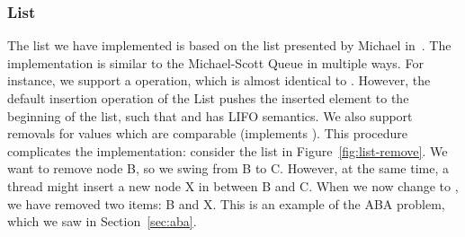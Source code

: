 \documentclass[b5paper]{report}
\begin{document}
\subsubsection{List\label{sec:impl-list}}

The list we have implemented is based on the list presented by Michael
in~\cite{michael2002high}. The implementation is similar to the Michael-Scott
Queue in multiple ways. For instance, we support a 
operation, which is almost identical to . However, the default
insertion operation of the List pushes the inserted element to the beginning of
the list, such that  and  has LIFO
semantics. We also support removals for values which are comparable (implements
).  This
procedure complicates the implementation: consider the list in
Figure~\ref{fig:list-remove}. We want to remove node B, so we swing
 from B to C. However, at the same time, a thread might insert a
new node X in between B and C. When we now change  to , we
have removed two items: B and X. This is an example of the ABA problem, which we
saw in Section~\ref{sec:aba}.
\end{document}
